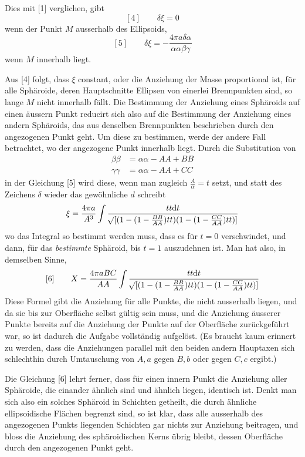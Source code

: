 Dies mit [1] verglichen, gibt
\[
[4]\qquad\delta\xi=0
\]
wenn der Punkt $M$ ausserhalb des Ellipsoids,
\[
[5]\qquad\delta\xi=-\frac{4\pi a\delta\alpha}{\alpha\alpha\beta\gamma}
\]
wenn $M$ innerhalb liegt.

Aus [4] folgt, dass $\xi$ constant, oder die Anziehung der Masse proportional ist, für alle Sphäroide, deren Hauptschnitte Ellipsen von einerlei Brennpunkten sind, so lange $M$ nicht innerhalb fällt. Die Bestimmung der Anziehung eines Sphäroids auf einen äussern Punkt reducirt sich also auf die Bestimmung der Anziehung eines andern Sphäroids, das aus denselben Brennpunkten beschrieben durch den angezogenen Punkt geht. Um diese zu bestimmen, werde der andere Fall betrachtet, wo der angezogene Punkt innerhalb liegt. Durch die Substitution von
\[
\begin{aligned}
\beta\beta&=\alpha\alpha-AA+BB\\
\gamma\gamma&=\alpha\alpha-AA+CC
\end{aligned}
\]
in der Gleichung [5] wird diese, wenn man zugleich $\frac{A}{\alpha}=t$ setzt, und statt des Zeichens $\delta$ wieder das gewöhnliche $d$ schreibt
\[
\xi=\frac{4\pi a}{A^3}\int\frac{tt\mathrm{d}t}{\mathord{{}^{}\!\surd}[(1-(1-\frac{BB}{AA})tt)(1-(1-\frac{CC}{AA})tt)]}
\]
wo das Integral so bestimmt werden muss, dass es für $t=0$ verschwindet, und dann, für das \textit{bestimmte} Sphäroid, bis $t=1$ auszudehnen ist. Man hat also, in demselben Sinne,
\[
[6]\qquad X=\frac{4\pi aBC}{AA}\int\frac{tt\mathrm{d}t}{\mathord{{}^{}\!\surd}[(1-(1-\frac{BB}{AA})tt)(1-(1-\frac{CC}{AA})tt)]}
\]
Diese Formel gibt die Anziehung für alle Punkte, die nicht ausserhalb liegen, und da sie bis zur Oberfläche selbst gültig sein muss, und die Anziehung äusserer Punkte bereits auf die Anziehung der Punkte auf der Oberfläche zurückgeführt war, so ist dadurch die Aufgabe vollständig aufgelöst. (Es braucht kaum erinnert zu werden, dass die Anziehungen parallel mit den beiden andern Hauptaxen sich schlechthin durch Umtauschung von $A,a$ gegen $B,b$ oder gegen $C,c$ ergibt.)

Die Gleichung [6] lehrt ferner, dass für einen innern Punkt die Anziehung aller Sphäroide, die einander ähnlich sind und ähnlich liegen, identisch ist. Denkt man sich also ein solches Sphäroid in Schichten getheilt, die durch ähnliche ellipsoidische Flächen begrenzt sind, so ist klar, dass alle ausserhalb des angezogenen Punkts liegenden Schichten gar nichts zur Anziehung beitragen, und bloss die Anziehung des sphäroidischen Kerns übrig bleibt, dessen Oberfläche durch den angezogenen Punkt geht.

